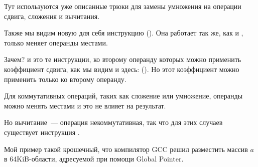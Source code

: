 Тут используются уже описанные трюки для замены умножения на операции сдвига, сложения и вычитания.

Также мы видим новую для себя инструкцию \RSB ().
Она работает так же, как и \SUB, только меняет операнды местами.

Зачем?
\SUB и \RSB это те инструкции, ко второму операнду которых можно применить коэффициент сдвига, как мы видим и здесь: (). 
Но этот коэффициент можно применить только ко второму операнду.

Для коммутативных операций, таких как сложение или умножение, 
операнды можно менять местами и это не влияет на результат.

Но вычитание~--- операция некоммутативная, так что для этих случаев существует инструкция \RSB.



Мой пример такой крошечный, что компилятор GCC решил разместить массив $a$ в 64KiB-области,
адресуемой при помощи Global Pointer.



